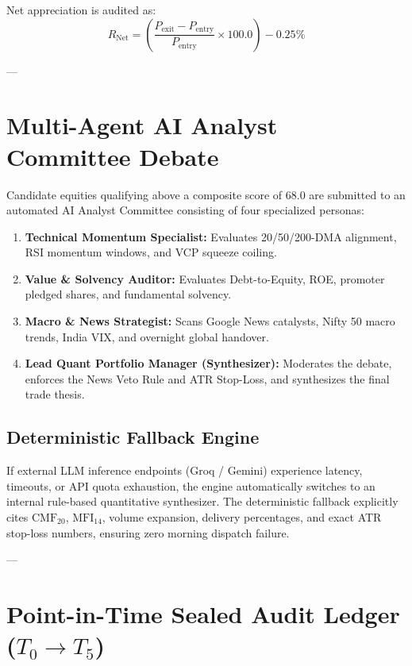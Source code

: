 \documentclass[11pt,a4paper]{article}
\begin{document}
Net appreciation is audited as:
\begin{equation}
R_{\text{Net}} = \left(\frac{P_{\text{exit}} - P_{\text{entry}}}{P_{\text{entry}}} \times 100.0\right) - 0.25\%
\end{equation}

---

\section{Multi-Agent AI Analyst Committee Debate}

Candidate equities qualifying above a composite score of 68.0 are submitted to an automated AI Analyst Committee consisting of four specialized personas:
\begin{enumerate}
    \item \textbf{Technical Momentum Specialist:} Evaluates 20/50/200-DMA alignment, RSI momentum windows, and VCP squeeze coiling.
    \item \textbf{Value \& Solvency Auditor:} Evaluates Debt-to-Equity, ROE, promoter pledged shares, and fundamental solvency.
    \item \textbf{Macro \& News Strategist:} Scans Google News catalysts, Nifty 50 macro trends, India VIX, and overnight global handover.
    \item \textbf{Lead Quant Portfolio Manager (Synthesizer):} Moderates the debate, enforces the News Veto Rule and ATR Stop-Loss, and synthesizes the final trade thesis.
\end{enumerate}

\subsection{Deterministic Fallback Engine}
If external LLM inference endpoints (Groq / Gemini) experience latency, timeouts, or API quota exhaustion, the engine automatically switches to an internal rule-based quantitative synthesizer. The deterministic fallback explicitly cites $\text{CMF}_{20}$, $\text{MFI}_{14}$, volume expansion, delivery percentages, and exact ATR stop-loss numbers, ensuring zero morning dispatch failure.

---

\section{Point-in-Time Sealed Audit Ledger ($T_0 \to T_5$)}
\end{document}
